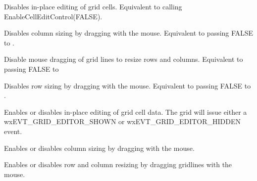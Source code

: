 
Disables in-place editing of grid cells. 
Equivalent to calling EnableCellEditControl(FALSE).

\label{wxgriddisabledragcolsize}


Disables column sizing by dragging with the mouse. Equivalent to passing FALSE to 
. 

\label{wxgriddisabledraggridsize}


Disable mouse dragging of grid lines to resize rows and columns. Equivalent to passing
FALSE to 

\label{wxgriddisabledragrowsize}


Disables row sizing by dragging with the mouse. Equivalent to passing FALSE to 
. 

\label{wxgridenablecelleditcontrol}


Enables or disables in-place editing of grid cell data. The grid will issue either a
wxEVT_GRID_EDITOR_SHOWN or wxEVT_GRID_EDITOR_HIDDEN event.

\label{wxgridenabledragcolsize}


Enables or disables column sizing by dragging with the mouse.

\label{wxgridenabledraggridsize}


Enables or disables row and column resizing by dragging gridlines with the mouse.

\label{wxgridenabledragrowsize}


